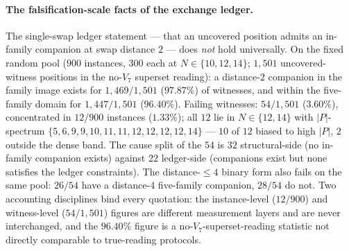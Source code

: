 \paragraph{The falsification-scale facts of the exchange ledger.}
The single-swap ledger statement --- that an uncovered position admits an
in-family companion at swap distance $2$ --- does \emph{not} hold
universally. On the fixed random pool ($900$ instances, $300$ each at
$N\in\{10,12,14\}$; $1{,}501$ uncovered-witness positions in the no-$V_7$
superset reading): a distance-$2$ companion in the family image exists for
$1{,}469/1{,}501$ ($97.87\%$) of witnesses, and within the five-family
domain for $1{,}447/1{,}501$ ($96.40\%$). Failing witnesses: $54/1{,}501$
($3.60\%$), concentrated in $12/900$ instances ($1.33\%$); all $12$ lie in
$N\in\{12,14\}$ with $|P|$-spectrum
$\{5,6,9,9,10,11,11,12,12,12,12,14\}$ --- $10$ of $12$ biased to high
$|P|$, $2$ outside the dense band. The cause split of the $54$ is
$32$ structural-side (no in-family companion exists) against $22$
ledger-side (companions exist but none satisfies the ledger constraints).
The distance-$\le4$ binary form also fails on the same pool: $26/54$ have
a distance-$4$ five-family companion, $28/54$ do not. Two accounting
disciplines bind every quotation: the instance-level ($12/900$) and
witness-level ($54/1{,}501$) figures are different measurement layers and
are never interchanged, and the $96.40\%$ figure is a
no-$V_7$-superset-reading statistic not directly comparable to
true-reading protocols.

